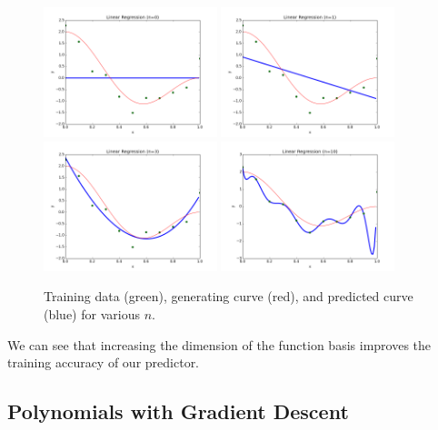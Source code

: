 \documentclass[10pt]{paper}
\begin{document}
\begin{figure}[ht!]
  \centering
  \label{fig:poly}
  \includegraphics[width=0.45\textwidth]{../images/poly0.png}
  \includegraphics[width=0.45\textwidth]{../images/poly1.png}
  \includegraphics[width=0.45\textwidth]{../images/poly3.png}
  \includegraphics[width=0.45\textwidth]{../images/poly10.png}
  \caption{Training data (green), generating curve (red), and predicted curve (blue) for various $n$.}
\end{figure}

We can see that increasing the dimension of the function basis improves the training accuracy of our predictor.

\subsection{Polynomials with Gradient Descent}
\end{document}
